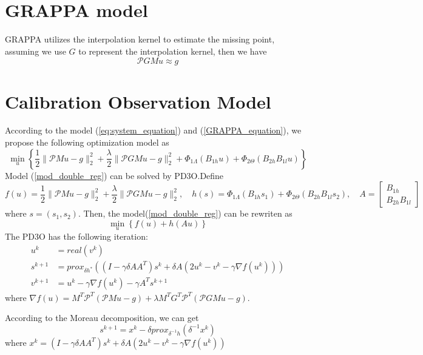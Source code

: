 \documentclass[UTF8]{article}
\begin{document}
\section{GRAPPA model}
\par GRAPPA utilizes the interpolation kernel to estimate the missing point, assuming we use $G$ to represent the interpolation kernel, then we have
\begin{equation} \label{GRAPPA_equation}
	\mathcal{P}GMu \approx g
\end{equation}

\section{Calibration Observation Model}
\par According to the model (\ref{eq:system_equation}) and (\ref{GRAPPA_equation}), we propose the following optimization model as
\begin{equation}\label{mod_double_reg}
	\min_{u} \left\{\frac{1}{2}\|\mathcal{P}Mu-g\|_2^2+  \frac{\lambda}{2}\|\mathcal{P}GMu-g \|_2^2 + \Phi_{1 \Lambda}(B_{1h} u) + \Phi_{2 \Theta}(B_{2h}B_{1l} u) \right\} 
\end{equation}
Model (\ref{mod_double_reg}) can be solved by PD3O.Define 
\begin{equation*}
	f(u) = \frac{1}{2}\|\mathcal{P}Mu-g\|_2^2+  \frac{\lambda}{2}\|\mathcal{P}GMu-g \|_2^2, \quad h(s) = \Phi_{1 \Lambda}(B_{1h} s_1) + \Phi_{2 \Theta}(B_{2h}B_{1l} s_2),\quad A = \begin{bmatrix}
		B_{1h} \\
		B_{2h}B_{1l}
	\end{bmatrix}
\end{equation*}
where $s = (s_1, s_2)$. Then, the model(\ref{mod_double_reg}) can be rewriten as 
\begin{equation}
	\min_{u} \left\{ f(u) + h(Au) \right\}
\end{equation}
The PD3O has the following iteration:
\begin{align*}
	u^{k} & = real(v^k)\\
	s^{k+1} &= prox_{\delta h^*} ((I-\gamma \delta AA^T)s^k + \delta A(2u^k-v^k-\gamma \nabla f(u^k)))\\
	v^{k+1} &= u^k-\gamma \nabla f(u^k) - \gamma A^T s^{k+1}
\end{align*}
where $\nabla f(u) = M^T \mathcal{P}^T (\mathcal{P}Mu-g) + \lambda M^T G^T \mathcal{P}^T(\mathcal{P}GMu-g)$.

According to the Moreau decomposition, we can get 
\begin{equation}
	s^{k+1} = x^k - \delta prox_{\delta^{-1} h} (\delta^{-1} x^k)
\end{equation}
where $x^k = (I-\gamma \delta AA^T)s^k + \delta A(2u^k-v^k-\gamma \nabla f(u^k))$
\newpage


\end{document}
